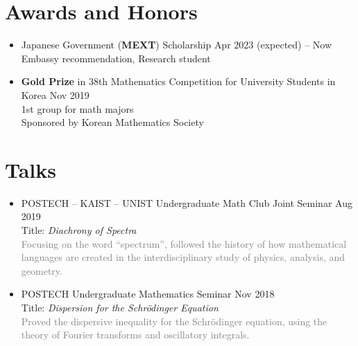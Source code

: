 \documentclass[11pt,a4paper]{article}
\begin{document}
\section*{Awards and Honors}
\begin{itemize}
\item
	Japanese Government (\textbf{MEXT}) Scholarship
	\hfill{\small Apr 2023 (expected) -- Now}\\
	Embassy recommendation, Research student
\item
	\textbf{Gold Prize} in 38th Mathematics Competition for University Students in Korea
	\hfill{\small Nov 2019}\\
	1st group for math majors\\
	Sponsored by Korean Mathematics Society
\end{itemize}




\section*{Talks}
\begin{itemize}
\item
	POSTECH -- KAIST -- UNIST Undergraduate Math Club Joint Seminar
	\hfill{\small Aug 2019}\\
	Title: \emph{Diachrony of Spectra}\\
	\textcolor{gray}{Focusing on the word ``spectrum'', followed the history of how mathematical languages are created in the interdisciplinary study of physics, analysis, and geometry.}
\item
	POSTECH Undergraduate Mathematics Seminar
	\hfill{\small Nov 2018}\\
	Title: \emph{Dispersion for the Schr\"odinger Equation}\\
	\textcolor{gray}{Proved the dispersive inequality for the Schr\"odinger equation, using the theory of Fourier transforms and oscillatory integrals.}
\end{itemize}
\end{document}
